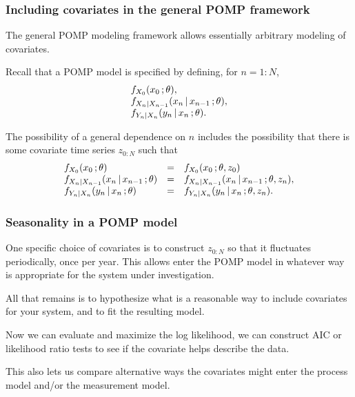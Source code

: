 \begin{frame}[fragile]

\frametitle{Including covariates in the general POMP framework}

\bi
\item The general POMP modeling framework allows essentially arbitrary modeling of covariates.

\item Recall that a POMP model is specified by defining, for $n=1:N$,
$$\begin{array}{l}
f_{X_{0}}(x_0\,;\theta),
\\
f_{X_{n}|X_{n-1}}(x_{n}{\, | \,} x_{n-1}\,;\theta),
\\
f_{Y_{n}|X_n}(y_{n}{\, | \,} x_n\,;\theta).
\end{array}$$

\item The possibility of a general dependence on $n$ includes the possibility that there is some covariate time series $z_{0:N}$ such that
$$\begin{array}{lcl}
f_{X_{0}}(x_0\,;\theta)&=& f_{X_{0}}(x_0\,;\theta,z_0)
\\
f_{X_{n}|X_{n-1}}(x_{n}{\, | \,} x_{n-1}\,;\theta) &=& f_{X_{n}|X_{n-1}}(x_{n}{\, | \,} x_{n-1}\,;\theta,z_n),
\\
f_{Y_{n}|X_n}(y_{n}{\, | \,} x_n\,;\theta) &=& f_{Y_{n}|X_n}(y_{n}{\, | \,} x_n\,;\theta,z_n).
\end{array}$$

\ei

\end{frame}

\begin{frame}[fragile]

\frametitle{Seasonality in a POMP model}

\bi

\item One specific choice of covariates is to construct $z_{0:N}$ so that it fluctuates periodically, once per year. This allows  enter the POMP model in whatever way is appropriate for the system under investigation.

\item All that remains is to hypothesize what is a reasonable way to include covariates for your system, and to fit the resulting model.

\item Now we can evaluate and maximize the log likelihood, we can construct AIC or likelihood ratio tests to see if the covariate helps describe the data.

\item This also lets us compare alternative ways the covariates might enter the process model and/or the measurement model.

\ei

\end{frame}

